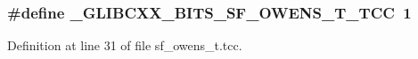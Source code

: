 \subsubsection[{\texorpdfstring{\+\_\+\+G\+L\+I\+B\+C\+X\+X\+\_\+\+B\+I\+T\+S\+\_\+\+S\+F\+\_\+\+O\+W\+E\+N\+S\+\_\+\+T\+\_\+\+T\+CC}{_GLIBCXX_BITS_SF_OWENS_T_TCC}}]{\setlength{\rightskip}{0pt plus 5cm}\#define \+\_\+\+G\+L\+I\+B\+C\+X\+X\+\_\+\+B\+I\+T\+S\+\_\+\+S\+F\+\_\+\+O\+W\+E\+N\+S\+\_\+\+T\+\_\+\+T\+CC~1}\hypertarget{sf__owens__t_8tcc_a5986cbb2c459a5e859ffe2fe1fa7cd25}{}\label{sf__owens__t_8tcc_a5986cbb2c459a5e859ffe2fe1fa7cd25}


Definition at line 31 of file sf\+\_\+owens\+\_\+t.\+tcc.

